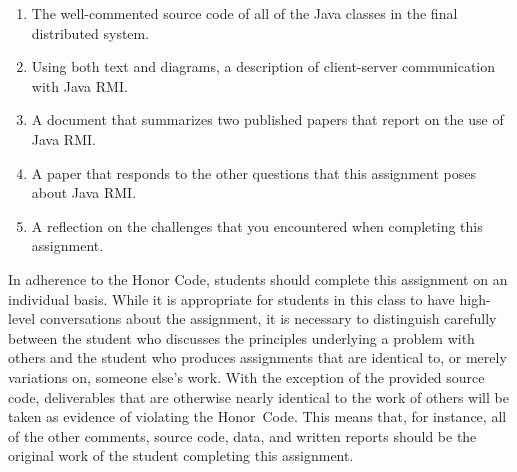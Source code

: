 \vspace*{-.1in}

\begin{enumerate}
  \itemsep 0em

  \item The well-commented source code of all of the Java classes in the final distributed system.

  \item Using both text and diagrams, a description of client-server communication with Java RMI.

  \item A document that summarizes two published papers that report on the use of Java RMI.

  \item A paper that responds to the other questions that this assignment poses about Java RMI.

  \item A reflection on the challenges that you encountered when completing this assignment.

\end{enumerate}

\vspace*{-.1in}


In adherence to the Honor Code, students should complete this assignment on an individual basis. While it is appropriate
for students in this class to have high-level conversations about the assignment, it is necessary to distinguish
carefully between the student who discusses the principles underlying a problem with others and the student who produces
assignments that are identical to, or merely variations on, someone else's work.  With the exception of the provided
source code, deliverables that are otherwise nearly identical to the work of others will be taken as evidence of
violating the \mbox{Honor Code}. This means that, for instance, all of the other comments, source code, data, and
written reports should be the original work of the student completing this assignment.



